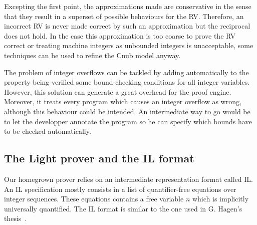 Excepting the first point, the approximations made are conservative  in the sense that they result in a superset of possible behaviours for the RV. Therefore, an incorrect RV is never made correct by such an approximation but the reciprocal does not hold. In the case this approximation is too coarse to prove the RV correct or treating machine integers as unbounded integers is unacceptable, some techniques can be used to refine the Cnub model anyway. 

\medskip

The problem of integer overflows can be tackled by adding automatically to the property being verified some bound-checking conditions for all integer variables. However, this solution can generate a great overhead for the proof engine. Moreover, it treats every program which causes an integer overflow as wrong, although this behaviour could be intended. An intermediate way to go would be to let the developper annotate the program so he can specify which bounds have to be checked automatically.

%




\subsection{The Light prover and the IL format} 

Our homegrown prover relies on an intermediate representation format called {IL}. An IL specification mostly consists in a list of quantifier-free equations over integer sequences. These equations contains a free variable $n$ which is implicitly universally quantified. The IL format is similar to the one used in G. Hagen's thesis~\cite{HagenPhD}.


